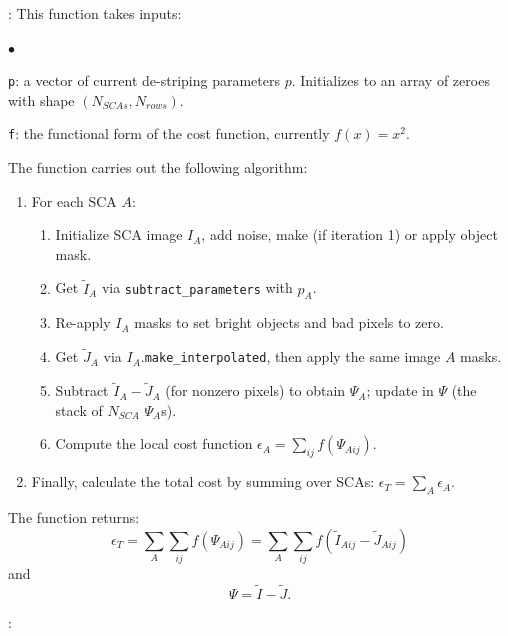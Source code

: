 \documentclass[]{pasj01}
\begin{document}
: This function takes inputs: 
\begin{list}{$\bullet$}{}
\item {\tt p}: a vector of current de-striping parameters $p$. Initializes to an array of zeroes with shape $(N_{SCAs}, N_{rows})$.
\item {\tt f}: the functional form of the cost function, currently $f(x)=x^2$.
\end{list}

The function carries out the following algorithm:
\begin{enumerate}
\item For each SCA $A$:
\begin{enumerate}
    \item Initialize SCA image $I_A$, add noise, make (if iteration 1) or apply object mask.
    \item Get $\tilde I_A$ via {\tt subtract\_parameters} with $p_A$.
    \item Re-apply $I_A$ masks to set bright objects and bad pixels to zero.
    \item Get $\tilde J_A$ via $I_A$.{\tt make\_interpolated}, then apply the same image $A$ masks.
    \item Subtract $ \tilde I_A - \tilde J_A$ (for nonzero pixels) to obtain $\Psi_A$; update in $\Psi$ (the stack of $N_{SCA}$ $\Psi_A$s).
    \item Compute the local cost function $\epsilon_A = \sum_{ij}f(\Psi_{Aij})$.
\end{enumerate}
\item Finally, calculate the total cost by summing over SCAs: $\epsilon_T=\sum_A\epsilon_A$.
\end{enumerate}
The function returns:
\begin{equation}
\epsilon_T = \sum_A\sum_{ij}f(\Psi_{Aij}) = \sum_A\sum_{ij}f(\tilde I_{Aij} - \tilde J_{Aij})
\end{equation}
and
\begin{equation}
    \Psi = \tilde I - \tilde J.
\end{equation}

\vskip 0.1in

:
\end{document}
